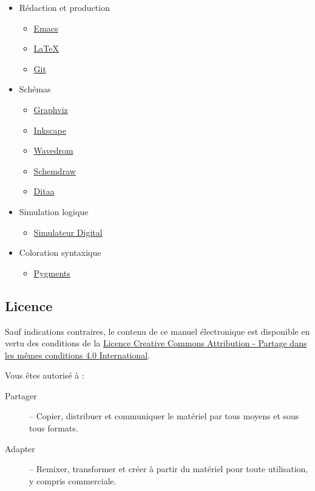 \documentclass[11pt]{article}
\begin{document}
\begin{itemize}
\item Rédaction et production
\begin{itemize}
\item \href{https://www.gnu.org/software/emacs/}{Emacs}
\item \href{https://www.latex-project.org/}{\LaTeX{}}
\item \href{https://git-scm.com}{Git}
\end{itemize}
\item Schémas
\begin{itemize}
\item \href{https://graphviz.org/}{Graphviz}
\item \href{https://inkscape.org}{Inkscape}
\item \href{https://wavedrom.com/}{Wavedrom}
\item \href{https://schemdraw.readthedocs.io/en/latest/}{Schemdraw}
\item \href{https://ditaa.sourceforge.net/}{Ditaa}
\end{itemize}
\item Simulation logique
\begin{itemize}
\item \href{https://github.com/hneemann/Digital}{Simulateur Digital}
\end{itemize}
\item Coloration syntaxique
\begin{itemize}
\item \href{https://pygments.org/docs/quickstart/}{Pygments}
\end{itemize}
\end{itemize}

\subsection*{Licence}
\label{sec:org08be474}

\begin{center}

\end{center}

Sauf indications contraires, le contenu de ce manuel électronique est
disponible en vertu des conditions de la
\href{https://creativecommons.org/licenses/by/4.0/deed.fr}{Licence
Creative Commons Attribution - Partage dans les mêmes conditions 4.0
International}.

Vous êtes autorisé à : 

\begin{description}
\item[{Partager}] – Copier, distribuer et communiquer le matériel par tous
moyens et sous tous formats.
\item[{Adapter}] – Remixer, transformer et créer à partir du matériel pour
toute utilisation, y compris commerciale.
\end{description}
\end{document}
